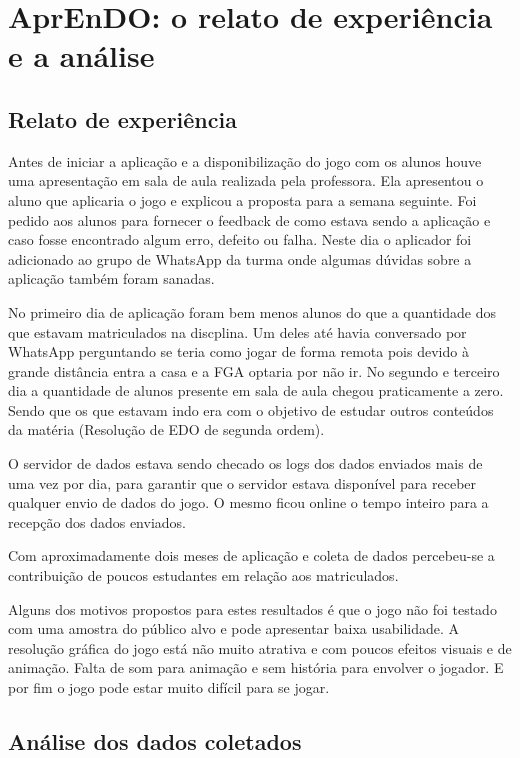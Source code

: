 \chapter[AprEnDO: o relato de experiência e a análise]{AprEnDO: o relato de experiência e a análise}
\section[Relato de experiência]{Relato de experiência}

Antes de iniciar a aplicação e a disponibilização do jogo com os alunos houve uma apresentação em sala de aula realizada pela professora. Ela apresentou o aluno que aplicaria o jogo e explicou a proposta para a semana seguinte. Foi pedido aos alunos para fornecer o feedback de como estava sendo a aplicação e caso fosse encontrado algum erro, defeito ou falha. Neste dia o aplicador foi adicionado ao grupo de WhatsApp da turma onde algumas dúvidas sobre a aplicação também foram sanadas.

No primeiro dia de aplicação foram bem menos alunos do que a quantidade dos que estavam matriculados na discplina. Um deles até havia conversado por WhatsApp perguntando se teria como jogar de forma remota pois devido à grande distância entra a casa e a FGA optaria por não ir. No segundo e terceiro dia a quantidade de alunos presente em sala de aula chegou praticamente a zero. Sendo que os que estavam indo era com o objetivo de estudar outros conteúdos da matéria (Resolução de EDO de segunda ordem).

O servidor de dados estava sendo checado os logs dos dados enviados mais de uma vez por dia, para garantir que o servidor estava disponível para receber qualquer envio de dados do jogo. O mesmo ficou online o tempo inteiro para a recepção dos dados enviados.

Com aproximadamente dois meses de aplicação e coleta de dados percebeu-se a contribuição de poucos estudantes em relação aos matriculados.

Alguns dos motivos propostos para estes resultados é que o jogo não foi testado com uma amostra do público alvo e pode apresentar baixa usabilidade. A resolução gráfica do jogo está não muito atrativa e com poucos efeitos visuais e de animação. Falta de som para animação e sem história para envolver o jogador. E por fim o jogo pode estar muito difícil para se jogar.

\section[Análise dos dados coletados]{Análise dos dados coletados}

